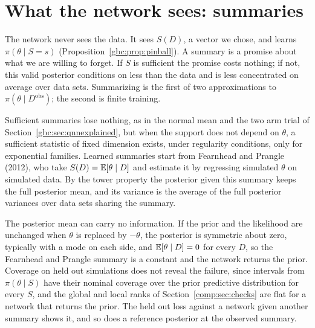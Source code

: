 \section{What the network sees: summaries}\label{comp:sec:summaries}

The network never sees the data. It sees $S(D)$, a vector we chose, and learns $\pi(\theta\mid S=s)$ (Proposition~\ref{gbc:prop:pinball}). A summary is a promise about what we are willing to forget. If $S$ is sufficient the promise costs nothing; if not, this valid posterior conditions on less than the data and is less concentrated on average over data sets. Summarizing is the first of two approximations to $\pi(\theta\mid D^{\mathrm{obs}})$; the second is finite training.

Sufficient summaries lose nothing, as in the normal mean and the two arm trial of Section~\ref{gbc:sec:qnnexplained}, but when the support does not depend on $\theta$, a sufficient statistic of fixed dimension exists, under regularity conditions, only for exponential families. Learned summaries start from Fearnhead and Prangle (2012), who take $S(D)=\mathbb{E}[\theta\mid D]$ and estimate it by regressing simulated $\theta$ on simulated data. By the tower property the posterior given this summary keeps the full posterior mean, and its variance is the average of the full posterior variances over data sets sharing the summary. 

The posterior mean can carry no information. If the prior and the likelihood are unchanged when $\theta$ is replaced by $-\theta$, the posterior is symmetric about zero, typically with a mode on each side, and $\mathbb{E}[\theta\mid D]=0$ for every $D$, so the Fearnhead and Prangle summary is a constant and the network returns the prior. Coverage on held out simulations does not reveal the failure, since intervals from $\pi(\theta\mid S)$ have their nominal coverage over the prior predictive distribution for every $S$, and the global and local ranks of Section~\ref{comp:sec:checks} are flat for a network that returns the prior. The held out loss against a network given another summary shows it, and so does a reference posterior at the observed summary.

